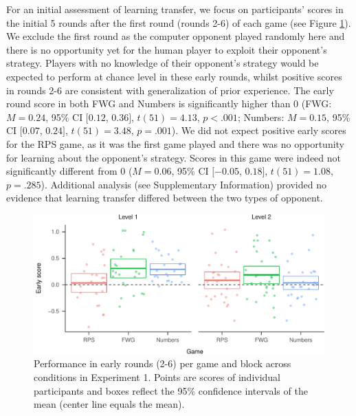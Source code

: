 \documentclass[smallextended]{svjour3}       %
\begin{document}
For an initial assessment of learning transfer, we focus on
participants' scores in the initial 5 rounds after the first round
(rounds 2-6) of each game (see Figure
\ref{fig:exp1-early-score-by-opp}). We exclude the first round as the
computer opponent played randomly here and there is no opportunity yet
for the human player to exploit their opponent's strategy. Players with
no knowledge of their opponent's strategy would be expected to perform
at chance level in these early rounds, whilst positive scores in rounds
2-6 are consistent with generalization of prior experience. The early
round score in both FWG and Numbers is significantly higher than 0 (FWG:
\(M = 0.24\), 95\% CI \([0.12\), \(0.36]\), \(t(51) = 4.13\),
\(p < .001\); Numbers: \(M = 0.15\), 95\% CI \([0.07\), \(0.24]\),
\(t(51) = 3.48\), \(p = .001\)). We did not expect positive early scores
for the RPS game, as it was the first game played and there was no
opportunity for learning about the opponent's strategy. Scores in this
game were indeed not significantly different from 0 (\(M = 0.06\), 95\%
CI \([-0.05\), \(0.18]\), \(t(51) = 1.08\), \(p = .285\)). Additional
analysis (see Supplementary Information) provided no evidence that
learning transfer differed between the two types of opponent.

\begin{figure}

{\centering \includegraphics[width=\textwidth]{CBB_v2_files/figure-latex/exp1-early-score-by-opp-1} 

}

\caption{\label{ref:figure4-caption}Performance in early rounds (2-6) per game and block across conditions in Experiment 1. Points are scores of individual participants and boxes reflect the 95\% confidence intervals of the mean (center line equals the mean).}\label{fig:exp1-early-score-by-opp}
\end{figure}
\end{document}
